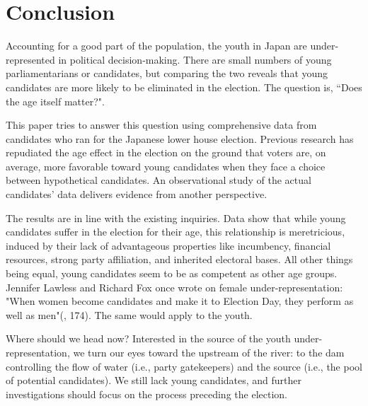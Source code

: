 \documentclass[a4paper, 12pt]{article}\usepackage[dvipdfmx]{graphicx}\usepackage[]{xcolor}
\begin{document}
\section{Conclusion}

Accounting for a good part of the population, the youth in Japan are under-represented in political decision-making. There are small numbers of young parliamentarians or candidates, but comparing the two reveals that young candidates are more likely to be eliminated in the election. The question is, ``Does the age itself matter?". 

This paper tries to answer this question using comprehensive data from candidates who ran for the Japanese lower house election. Previous research has repudiated the age effect in the election on the ground that voters are, on average, more favorable toward young candidates when they face a choice between hypothetical candidates. An observational study of the actual candidates' data delivers evidence from another perspective. 

The results are in line with the existing inquiries. Data show that while young candidates suffer in the election for their age, this relationship is meretricious, induced by their lack of advantageous properties like incumbency, financial resources, strong party affiliation, and inherited electoral bases. All other things being equal, young candidates seem to be as competent as other age groups. Jennifer Lawless and Richard Fox once wrote on female under-representation: "When women become candidates and make it to Election Day, they perform as well as men"(\citet{lawless2010still}, 174). The same would apply to the youth. 

Where should we head now? Interested in the source of the youth under-representation, we turn our eyes toward the upstream of the river: to the dam controlling the flow of water (i.e., party gatekeepers) and the source (i.e., the pool of potential candidates). We still lack young candidates, and further investigations should focus on the process preceding the election.

\newpage



\end{document}
